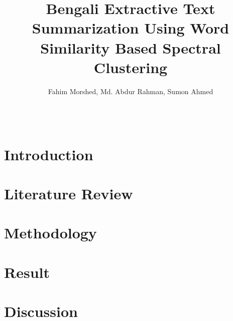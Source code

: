 \documentclass[11pt]{article}
\title{Bengali Extractive Text Summarization Using Word Similarity Based Spectral Clustering}
\author{Fahim Morshed, Md. Abdur Rahman, Sumon Ahmed}
\begin{document}
    \maketitle
    \setlength{\parindent}{0pt}
    \begin{abstract}
        \blindtext\\
    \end{abstract}

    \section{Introduction}\label{sec:introduction}
    

    \section{Literature Review}\label{sec:literature-review}
    

    \section{Methodology}\label{sec:methodology}
    

    \section{Result}\label{sec:result}
    

    \section{Discussion}\label{sec:discussion}
    


    
    
\end{document}
